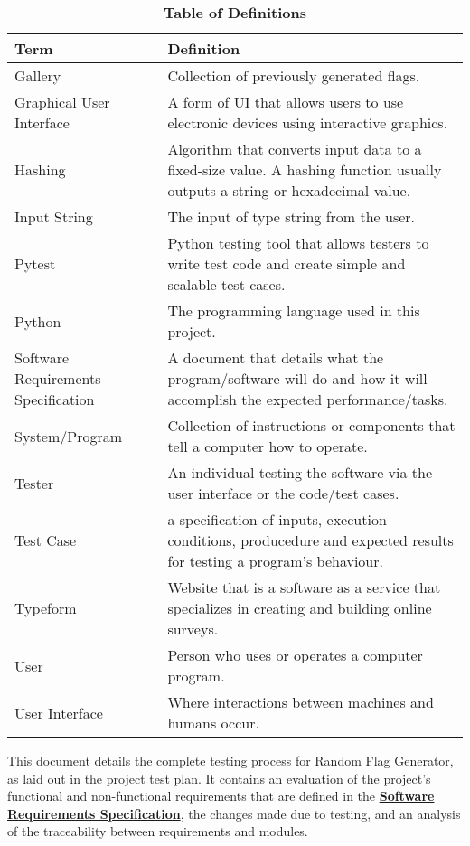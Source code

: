 \documentclass[12pt, titlepage]{article}
\newcommand{\newterm}[1]{\label{Term:#1} \MakeUppercase #1}
\begin{document}
\newpage
\begin{table}[htbp]
\caption{\textbf{Table of Definitions}} \label{def}

\begin{tabularx}{\textwidth}{p{3cm}X}
\toprule
\textbf{Term} & \textbf{Definition}\\
\midrule
\newterm{Gallery} & Collection of previously generated flags.\\
\hline
\newterm{Graphical User Interface} & A form of UI that allows users to use
  electronic devices using interactive graphics.\\
\hline
\newterm{Hashing} & Algorithm that converts input data to a fixed-size value.
  A hashing function usually outputs a string or hexadecimal value.\\
\hline
\newterm{Input String} & The input of type string from the user.\\
\hline
\newterm{Pytest} & Python testing tool that allows testers to write test code
  and create simple and scalable test cases.\\
\hline
\newterm{Python} & The programming language used in this project.\\
\hline
\newterm{Software Requirements Specification} & A document that details what
  the program/software will do and how it will accomplish the expected
  performance/tasks.\\
\hline
\newterm{System/Program} & Collection of instructions or components that tell
  a computer how to operate.\\
\hline
\newterm{Tester} & An individual testing the software via the user interface
  or the code/test cases.\\
\hline
\newterm{Test Case} & a specification of inputs, execution conditions,
  producedure and expected results for testing a program's behaviour.\\
\hline
\newterm{Typeform} & Website that is a software as a service that specializes
  in creating and building online surveys.\\
\hline
\newterm{User} & Person who uses or operates a computer program.\\
\hline
\newterm{User Interface} & Where interactions between machines and humans
  occur.\\
\bottomrule
\end{tabularx}
    
\end{table} 

\newpage

This document details the complete testing process for Random Flag Generator,
as laid out in the project test plan. It contains an evaluation of the
project's functional and non-functional requirements that are defined in the
\hyperlink{https://gitlab.cas.mcmaster.ca/palanicv/3xa3__l01_gr16_project/-/blob/master/Doc/Rev1/SRS/RequirementsDocument.pdf}{\textbf{Software Requirements Specification}},
the changes made due to testing, and an analysis of the traceability between
requirements and modules.
\end{document}
